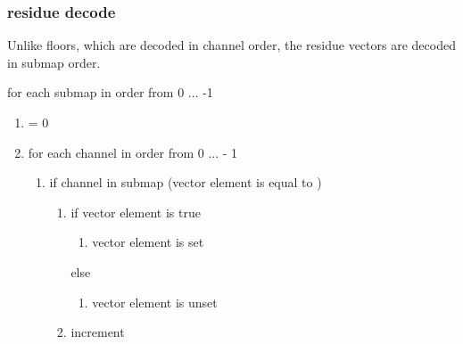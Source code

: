 \subsubsection{residue decode}

Unlike floors, which are decoded in channel order, the residue vectors
are decoded in submap order.

for each submap \varname{[i]} in order from 0 ... -1

\begin{enumerate}
 \item \varname{[ch]} = 0
 \item for each channel \varname{[j]} in order from 0 ...  - 1
  \begin{enumerate}
   \item if channel \varname{[j]} in submap \varname{[i]} (vector  element \varname{[j]} is equal to \varname{[i]})
    \begin{enumerate}
     \item if vector \varname{[no\_residue]} element \varname{[j]} is true
      \begin{enumerate}
       \item vector  element \varname{[ch]} is set
      \end{enumerate}
     else
      \begin{enumerate}
       \item vector  element \varname{[ch]} is unset
      \end{enumerate}

     \item increment \varname{[ch]}
    \end{enumerate}


\end{enumerate}
\end{enumerate}
